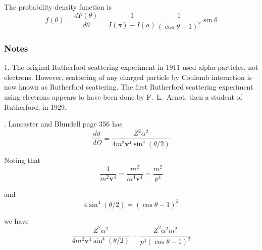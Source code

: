 The probability density function is
\begin{equation*}
f(\theta)=\frac{dF(\theta)}{d\theta}=\frac{1}{I(\pi)-I(a)}\frac{1}{(\cos\theta-1)^2}\sin\theta
\end{equation*}

\subsubsection*{Notes}
1. The original Rutherford scattering experiment in 1911 used alpha particles, not electrons.
However, scattering of any charged particle by Coulomb interaction
is now known as Rutherford scattering.
The first Rutherford scattering experiment using electrons appears to have
been done by F.~L.~Arnot, then a student of Rutherford, in 1929.

. Lancaster and Blundell page 356 has
\begin{equation*}
\frac{d\sigma}{d\Omega}
=\frac{Z^2\alpha^2}{4m^2\mathbf v^4\sin^4(\theta/2)}
\end{equation*}

Noting that
\begin{equation*}
\frac{1}{m^2\mathbf v^4}=\frac{m^2}{m^4\mathbf v^4}=\frac{m^2}{p^4}
\end{equation*}

and
\begin{equation*}
4\sin^4(\theta/2)=(\cos\theta-1)^2
\end{equation*}

we have
\begin{equation*}
\frac{Z^2\alpha^2}{4m^2\mathbf v^4\sin^4(\theta/2)}
=\frac{Z^2\alpha^2m^2}{p^4(\cos\theta-1)^2}
\end{equation*}


